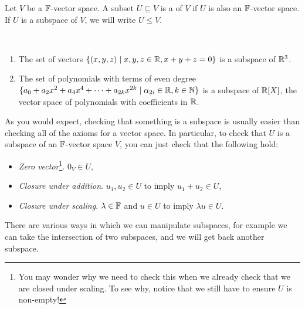 \documentclass[a4paper]{scrartcl}
\begin{document}
\begin{definition}[Subspace]
    Let $V$ be a $\mathbb{F}$-vector space.
    A subset $U \subseteq V$ is a  of $V$ if $U$ is also an $\mathbb{F}$-vector space. If $U$ is a subspace of $V$, we will write $U \leq V$.
    
\end{definition}

\begin{example}~
    \vspace{-1.5\baselineskip}
    \begin{enumerate}[label=(\roman*)]
        \item The set of vectors $\{(x, y, z) \mid x, y, z \in \mathbb{R}, x + y + z = 0\}$ is a subspace of $\mathbb{R}^3$.
        \item The set of polynomials with terms of even degree $\{ a_0 + a_2 x^2 + a_4 x^4 + \cdots + a_{2k} x^{2k} \mid \alpha_{2i} \in \mathbb{R}, k \in \mathbb{N}\}$ is a subspace of $\mathbb{R}[X]$, the vector space of polynomials with coefficients in $\mathbb{R}$.
    \end{enumerate}
\end{example}

As you would expect, checking that something is a subspace is usually easier than checking all of the axioms for a vector space. In particular, to check that $U$ is a subspace of an $\mathbb{F}$-vector space $V$, you can just check that the following hold:
\begin{itemize}
    \item \emph{Zero vector}\footnote{You may wonder why we need to check this when we already check that we are closed under scaling. To see why, notice that we still have to ensure $U$ is non-empty!}. $0_V \in U$,
    \item \emph{Closure under addition}. $u_1, u_2 \in U$ to imply $u_1 + u_2 \in U$,
    \item \emph{Closure under scaling}. $\lambda \in \mathbb{F}$ and $u \in U$ to imply $\lambda u \in U$.
\end{itemize}


There are various ways in which we can manipulate subspaces, for example we can take the intersection of two subspaces, and we will get back another subspace. 
\end{document}
